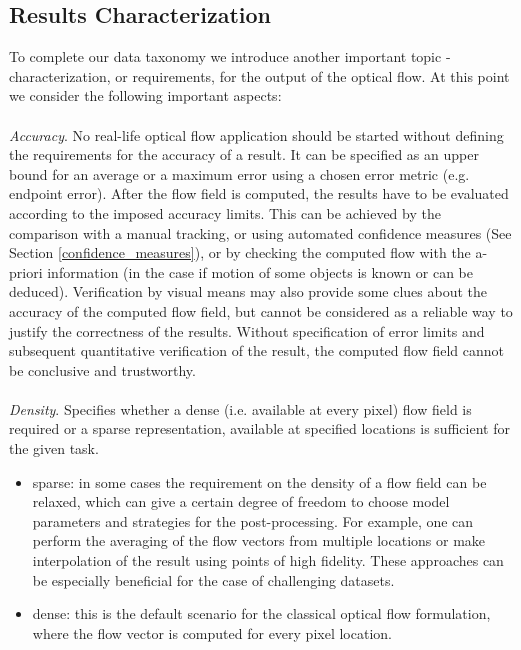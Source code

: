 \subsection{Results Characterization}

To complete our data taxonomy we introduce another important topic - characterization, or requirements, for the output of the  optical flow.
At this point we consider the following important aspects:
\\
\\
\noindent \textit{Accuracy}. No real-life optical flow application should be started without defining the requirements for the accuracy of a result. It can be specified as an upper bound for an average or a maximum error using a chosen error metric (e.g. endpoint error). After the flow field is computed, the results have to be evaluated according to the imposed accuracy limits. This can be achieved by the  comparison with a manual tracking, or using automated confidence measures (See Section \ref{confidence_measures}), or by checking the computed flow with the a-priori information (in the case if motion of some objects is known or can be deduced).   
Verification by visual means may also provide some clues about the accuracy of the computed flow field, but cannot be considered as a reliable way to justify the correctness of the results.  Without specification of error limits and subsequent quantitative verification of the result, the computed flow field cannot be conclusive and trustworthy.            
\\
\\
\noindent \textit{Density}. Specifies whether a dense (i.e. available at every pixel) flow field is required or a sparse representation, available at specified locations is sufficient for the given task. 
\begin{itemize}
	\item sparse: in some cases the requirement on the density of a flow field can be relaxed, which can give a certain degree of freedom to choose model parameters and strategies for the post-processing. For example, one can perform the averaging of the flow vectors from multiple locations or make interpolation of the result using points of high fidelity. These approaches can be especially beneficial for the case of challenging datasets.
	
	\item dense: this is the default scenario for the classical optical flow formulation, where the flow vector is computed for every pixel location.
\end{itemize}

